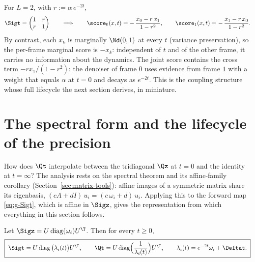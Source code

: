 For $L = 2$, with $r := \alpha\, e^{-2t}$,
\begin{equation}
  \Sigt = \begin{pmatrix} 1 & r \\ r & 1 \end{pmatrix}
  \qquad\Longrightarrow\qquad
  \score_0(x, t) = -\,\frac{x_0 - r\, x_1}{1 - r^2},
  \qquad
  \score_1(x, t) = -\,\frac{x_1 - r\, x_0}{1 - r^2}.
  \label{eq:g-K2-score}
\end{equation}
By contrast, each $x_k$ is marginally $\Nd(0,1)$ at every $t$ (variance
preservation), so the per-frame marginal score is $-x_k$: independent of
$t$ and of the other frame, it carries no information about the dynamics.
The joint score contains the cross term $-r x_1/(1-r^2)$: the denoiser of
frame $0$ uses evidence from frame $1$ with a weight that equals $\alpha$
at $t = 0$ and decays as $e^{-2t}$. This is the coupling structure whose
full lifecycle the next section derives, in miniature.

\section{The spectral form and the lifecycle of the precision}
\label{sec:g-lifecycle}

How does $\Qt$ interpolate between the tridiagonal $\Qz$ at $t = 0$ and
the identity at $t = \infty$? The analysis rests on the spectral theorem
and its affine-family corollary (Section~\ref{sec:matrix-tools}): affine
images of a symmetric matrix share its eigenbasis,
$(cA + dI)\, u_i = (c\,\omega_i + d)\, u_i$. Applying this to the
forward map \eqref{eq:g-Sigt}, which is affine in $\Sigz$, gives the
representation from which everything in this section follows.

\begin{theorem}\label{thm:g-three-forms}
Let $\Sigz = U \operatorname{diag}(\omega_i) U^\T$. Then for every
$t \geq 0$,
\begin{equation}
  \boxed{\;
  \Sigt = U \operatorname{diag}\big( \lambda_i(t) \big) U^\T,
  \qquad
  \Qt = U \operatorname{diag}\!\Big( \frac{1}{\lambda_i(t)} \Big) U^\T,
  \qquad
  \lambda_i(t) = e^{-2t} \omega_i + \Deltat .
  \;}
  \label{eq:g-Qt-spec}
\end{equation}
\end{theorem}

